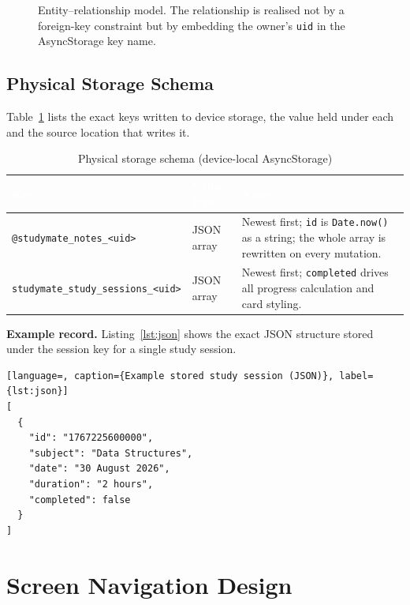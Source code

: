 \documentclass[12pt,a4paper,oneside]{report}
\begin{document}
\begin{figure}[H]
\caption{Entity--relationship model. The relationship is realised not by a foreign-key
constraint but by embedding the owner's \texttt{uid} in the AsyncStorage key name.}
\label{fig:er}
\end{figure}

\subsection{Physical Storage Schema}

Table~\ref{tab:schema} lists the exact keys written to device storage, the value held under each and the source location that writes it.

\begin{table}[H]
\centering
\caption{Physical storage schema (device-local AsyncStorage)}
\label{tab:schema}
\small
\begin{tabularx}{\textwidth}{@{}p{5.6cm}p{2.4cm}X@{}}
\toprule
\rowcolor{tblhead} \textcolor{white}{\textbf{Key}} &
\textcolor{white}{\textbf{Value type}} &
\textcolor{white}{\textbf{Notes}} \\
\midrule
\texttt{@studymate\_notes\_<uid>} & JSON array & Newest first; \texttt{id} is
  \texttt{Date.now()} as a string; the whole array is rewritten on every mutation. \\
\texttt{studymate\_study\_sessions\_<uid>} & JSON array & Newest first;
  \texttt{completed} drives all progress calculation and card styling. \\
\bottomrule
\end{tabularx}
\end{table}

\noindent\textbf{Example record.} Listing~\ref{lst:json} shows the exact JSON structure
stored under the session key for a single study session.
\begin{lstlisting}[language=, caption={Example stored study session (JSON)}, label={lst:json}]
[
  {
    "id": "1767225600000",
    "subject": "Data Structures",
    "date": "30 August 2026",
    "duration": "2 hours",
    "completed": false
  }
]
\end{lstlisting}

\section{Screen Navigation Design}
\end{document}
